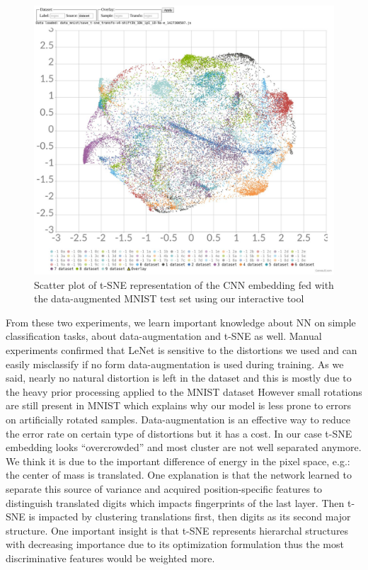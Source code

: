 \documentclass[a4paper,12pt]{report}
\newcommand{\eg}{e.g.}
\begin{document}
\begin{figure}[h]
    \begin{center}
        \includegraphics[width=\textwidth]{thesis_figures/mnist_da_tsne.jpg}
    \end{center}
    \caption{Scatter plot of t-SNE representation of the CNN embedding fed with the data-augmented MNIST test set using our interactive tool}
    \label{fig:mnist_da_tsne}
\end{figure}

From these two experiments, we learn important knowledge about NN on simple classification tasks, about data-augmentation and t-SNE as well.
Manual experiments confirmed that LeNet is sensitive to the distortions we used and can easily misclassify if no form data-augmentation is used during training.
As we said, nearly no natural distortion is left in the dataset and this is mostly due to the heavy prior processing applied to the MNIST dataset
However small rotations are still present in MNIST which explains why our model is less prone to errors on artificially rotated samples.
Data-augmentation is an effective way to reduce the error rate on certain type of distortions but it has a cost.
In our case t-SNE embedding looks ``overcrowded'' and most cluster are not well separated anymore.
We think it is due to the important difference of energy in the pixel space, \eg: the center of mass is translated.
One explanation is that the network learned to separate this source of variance and acquired position-specific features to distinguish translated digits which impacts fingerprints of the last layer.
Then t-SNE is impacted by clustering translations first, then digits as its second major structure.
One important insight is that t-SNE represents hierarchal structures with decreasing importance due to its optimization formulation thus the most discriminative features would be weighted more.
\end{document}
